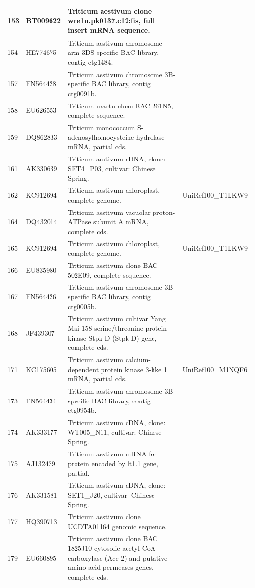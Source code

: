 \documentclass[10.9pt]{article} %
\begin{document}
{\begin{longtable}{|p{1.5cm}|p{2cm}|p{9cm}|p{3cm}|}
\hline
153 & BT009622 & Triticum aestivum clone wre1n.pk0137.c12:fis, full insert mRNA sequence. & \\
\hline
154 & HE774675 & Triticum aestivum chromosome arm 3DS-specific BAC library, contig ctg1484. & \\
\hline
157 & FN564428 & Triticum aestivum chromosome 3B-specific BAC library, contig ctg0091b. & \\
\hline
158 & EU626553 & Triticum urartu clone BAC 261N5, complete sequence. & \\
\hline
159 & DQ862833 & Triticum monococcum S-adenosylhomocysteine hydrolase mRNA, partial cds. & \\
\hline
161 & AK330639 & Triticum aestivum cDNA, clone: SET4\_P03, cultivar: Chinese Spring. & \\
\hline
162 & KC912694 & Triticum aestivum chloroplast, complete genome. & UniRef100\_T1LKW9\\
\hline
164 & DQ432014 & Triticum aestivum vacuolar proton-ATPase subunit A mRNA, complete cds. & \\
\hline
165 & KC912694 & Triticum aestivum chloroplast, complete genome. & UniRef100\_T1LKW9\\
\hline
166 & EU835980 & Triticum aestivum clone BAC 502E09, complete sequence. & \\
\hline
167 & FN564426 & Triticum aestivum chromosome 3B-specific BAC library, contig ctg0005b. & \\
\hline
168 & JF439307 & Triticum aestivum cultivar Yang Mai 158 serine/threonine protein kinase Stpk-D (Stpk-D) gene, complete cds. & \\
\hline
171 & KC175605 & Triticum aestivum calcium-dependent protein kinase 3-like 1 mRNA, partial cds. & UniRef100\_M1NQF6\\
\hline
173 & FN564434 & Triticum aestivum chromosome 3B-specific BAC library, contig ctg0954b. & \\
\hline
174 & AK333177 & Triticum aestivum cDNA, clone: WT005\_N11, cultivar: Chinese Spring. & \\
\hline
175 & AJ132439 & Triticum aestivum mRNA for protein encoded by lt1.1 gene, partial. & \\
\hline
176 & AK331581 & Triticum aestivum cDNA, clone: SET1\_J20, cultivar: Chinese Spring. & \\
\hline
177 & HQ390713 & Triticum aestivum clone UCDTA01164 genomic sequence. & \\
\hline
179 & EU660895 & Triticum aestivum clone BAC 1825J10 cytosolic acetyl-CoA carboxylase (Acc-2) and putative amino acid permeases genes, complete cds. & \\

\end{longtable}}
\end{document}
